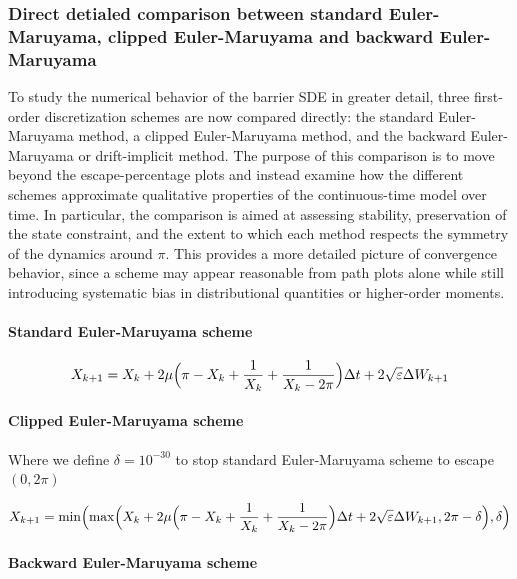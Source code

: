 \documentclass[11pt]{article}
\newcommand{\1}{\mathbbm{1}}
\theoremstyle{plain}
\theoremstyle{definition}
\theoremstyle{remark}
\begin{document}
\subsubsection{Direct detialed comparison between standard Euler-Maruyama, clipped Euler-Maruyama and  backward Euler-Maruyama}

To study the numerical behavior of the barrier SDE in greater detail, three first-order discretization schemes are now compared directly: the standard Euler-Maruyama method, a clipped Euler-Maruyama method, and the backward Euler-Maruyama or drift-implicit method. The purpose of this comparison is to move beyond the escape-percentage plots and instead examine how the different schemes approximate qualitative properties of the continuous-time model over time. In particular, the comparison is aimed at assessing stability, preservation of the state constraint, and the extent to which each method respects the symmetry of the dynamics around $\pi$. This provides a more detailed picture of convergence behavior, since a scheme may appear reasonable from path plots alone while still introducing systematic bias in distributional quantities or higher-order moments.

\paragraph{Standard Euler-Maruyama scheme}
\begin{align}
    X_{k+1}=X_{k}+2\mu \Bigl (\pi -X_{k}+\frac{1}{X_{k}}+\frac{1}{X_{k}-2\pi}\Bigr ) \Delta t +2\sqrt{\varepsilon} \Delta W_{k+1}
    \label{eq:standard-Euler-Maruyama}
\end{align}

\paragraph{Clipped Euler-Maruyama scheme}

Where we define $\delta=10^{-30}$ to stop standard Euler-Maruyama scheme to escape $(0,2\pi)$


\begin{align}
    X_{k+1}=\min \Bigl (\max \Bigl (X_{k}+2\mu \Bigl (\pi -X_{k}+\frac{1}{X_{k}}+\frac{1}{X_{k}-2\pi}\Bigr ) \Delta t +2\sqrt{\varepsilon} \Delta W_{k+1} , 2\pi-\delta \Bigr ), \delta \Bigr )
    \label{eq:clipped-Euler-Maruyama}
\end{align}

\paragraph{Backward Euler-Maruyama scheme}
\end{document}
